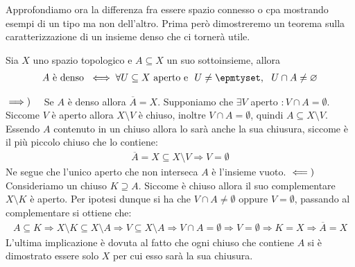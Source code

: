 Approfondiamo ora la differenza fra essere spazio connesso o cpa mostrando esempi di un tipo ma non dell'altro. Prima però dimostreremo un teorema sulla caratterizzazione di un insieme denso che ci tornerà utile.
\begin{theorema}
	Sia $X$ uno spazio topologico e $A\subseteq X$ un suo sottoinsieme, allora
		\begin{gather*}
			A \text{ è denso }\iff \forall U\subseteq X \text{ aperto e } \ U\neq\epmtyset, \ \ U\cap A\neq\emptyset	
		\end{gather*}
\end{theorema}
\begin{demonstration}
	$\implies)\quad$ Se $A$ è denso allora $\overline{A}=X$. Supponiamo che $\exists V$ aperto $\colon V\cap A=\emptyset$. Siccome $V$ è aperto allora $X\setminus V$ è chiuso, inoltre $V\cap A=\emptyset$, quindi $A\subseteq X\setminus V$. Essendo $A$ contenuto in un chiuso allora lo sarà anche la sua chiusura, siccome è il più piccolo chiuso che lo contiene:
		\begin{gather*}
			\overline{A}=X\subseteq X\setminus V \Rightarrow V=\emptyset
		\end{gather*}
	Ne segue che l'unico aperto che non interseca $A$ è l'insieme vuoto. \newline 
	$\impliedby)\quad$ Consideriamo un chiuso $K\supseteq A$. Siccome è chiuso allora il suo complementare $X\setminus K$ è aperto. Per ipotesi dunque si ha che $V\cap A\neq \emptyset$ oppure $V=\emptyset$, passando al complementare si ottiene che:
		\begin{gather*}
			A\subseteq K \Rightarrow X\setminus K \subseteq X\setminus A \Rightarrow V\subseteq X\setminus A \Rightarrow V\cap A=\emptyset \Rightarrow V=\emptyset \Rightarrow K=X \Rightarrow \overline{A}=X
		\end{gather*}
	L'ultima implicazione è dovuta al fatto che ogni chiuso che contiene $A$ si è dimostrato essere solo $X$ per cui esso sarà la sua chiusura.
\end{demonstration}

